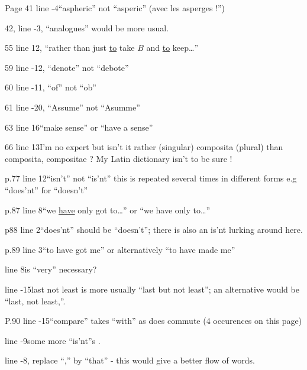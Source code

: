 Page 41 \unsure{-}line -4\quad ``aspheric'' not ``asperic'' (avec\unsure{,|-} les asperges !'')

42, line -3, ``analogues'' would be more usual.

55 line 12, ``rather than just \uline{to} take $B$ and \uline{to} keep\ldots''

59 line -12, ``denote'' not ``debote''

60 line -11, ``of'' not ``ob''

61 line -20, ``Assume'' not ``Asumme''

63 line 16\quad ``make sense'' or ``have a sense''

66 line 13\quad I'm no  expert but isn't it rather  (singular) composita (plural) than composita, compositae ? My Latin dictionary isn't  to be sure !

p.77 line 12\quad ``isn't'' not ``is'nt'' this is repeated several times in different forms e.g ``does'nt'' for ``doesn't''

p.87 line 8\quad ``we \uline{have} only got to\ldots'' or ``we have only to\ldots''

p88 line 2\quad ``does'nt'' should be ``doesn't''; there is also an is'nt lurking around here.

p.89 line 3\quad ``to have got me'' or alternatively ``to have made me''

line 8\quad is ``very'' necessary?

line -15\quad {}last not least is more usually ``last but not least''; an alternative would be ``last, not least,''.

P.90 line -15\quad ``compare'' takes ``with'' as does commute (4 occurences on this page)

line -9\quad some more ``is'nt''s .

line -8, replace ``,'' by ``that'' - this would give a better flow of words.

